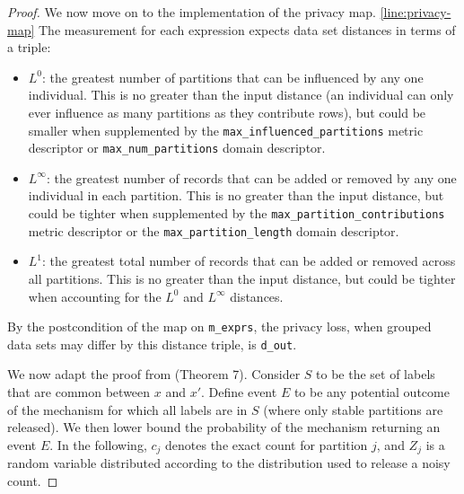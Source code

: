 \documentclass{article}
\begin{document}
\begin{proof}
We now move on to the implementation of the privacy map. \ref{line:privacy-map}
The measurement for each expression expects data set distances in terms of a triple:
\begin{itemize}
    \item $L^0$: the greatest number of partitions that can be influenced by any one individual.
    This is no greater than the input distance (an individual can only ever influence as many partitions as they contribute rows),
    but could be smaller when supplemented by
    the \texttt{max\_influenced\_partitions} metric descriptor or \texttt{max\_num\_partitions} domain descriptor.
    \item $L^\infty$: the greatest number of records that can be added or removed by any one individual in each partition.
    This is no greater than the input distance,
    but could be tighter when supplemented by
    the \texttt{max\_partition\_contributions} metric descriptor or the \texttt{max\_partition\_length} domain descriptor.
    \item $L^1$: the greatest total number of records that can be added or removed across all partitions.
    This is no greater than the input distance,
    but could be tighter when accounting for the $L^0$ and $L^\infty$ distances.
\end{itemize}

By the postcondition of the map on \texttt{m\_exprs}, the privacy loss,
when grouped data sets may differ by this distance triple,
is \texttt{d\_out}.



We now adapt the proof from \cite{rogers2023unifyingprivacyanalysisframework} (Theorem 7).
Consider $S$ to be the set of labels that are common between $x$ and $x'$.
Define event $E$ to be any potential outcome of the mechanism for which all labels are in $S$
(where only stable partitions are released).
We then lower bound the probability of the mechanism returning an event $E$.
In the following, $c_j$ denotes the exact count for partition $j$,
and $Z_j$ is a random variable distributed according to the distribution used to release a noisy count.


\end{proof}
\end{document}
